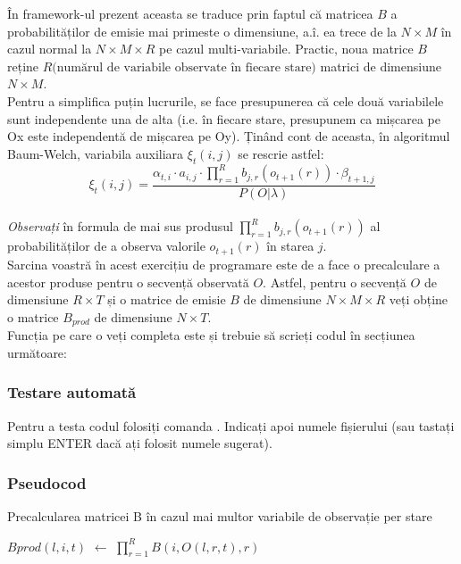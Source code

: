 \documentclass[12pt]{article}
\begin{document}
În framework-ul prezent aceasta se traduce prin faptul că matricea $B$ a probabilităților de emisie mai primeste
o dimensiune, a.î. ea trece de la $N \times M$ în cazul normal la $N \times M \times R$ pe cazul multi-variabile. Practic, noua matrice $B$ reține $R \mbox{(numărul de variabile observate în fiecare stare)}$ matrici de dimensiune $N \times M$.\\%
Pentru a simplifica puțin lucrurile, se face presupunerea că cele două variabilele sunt independente una de alta
(i.e. în fiecare stare, presupunem ca mișcarea pe Ox este independentă de mișcarea pe Oy). Ținând cont de aceasta,
în algoritmul Baum-Welch, variabila auxiliara $\xi_t(i,j)$ se rescrie astfel:
\begin{equation*}
	 \xi_t(i,j) = \frac{\alpha_{t,i}\cdot a_{i,j} \cdot \prod_{r=1}^{R}b_{j,r}(o_{t+1}(r)) \cdot \beta_{t+1,j}}
	 					{P(O \vert \lambda)}
\end{equation*}
\\%
\emph{Observați} în formula de mai sus produsul $\prod_{r=1}^{R}b_{j,r}(o_{t+1}(r))$ al probabilităților de a observa valorile $o_{t+1}(r)$ în starea $j$.\\
Sarcina voastră în acest exercițiu de programare este de a face o precalculare a acestor produse pentru o secvență observată $O$. Astfel, pentru o secvență $O$ de dimensiune $R \times T$ și o matrice de emisie $B$ de dimensiune 
$N \times M \times R$ veți obține o matrice $B_{prod}$ de dimensiune $N \times T$.
\\
Funcția pe care o veți completa este  și trebuie să scrieți codul în secțiunea următoare:



\subsubsection{Testare automată}

Pentru a testa codul folosiți comanda
. Indicați apoi numele
fișierului (sau tastați simplu ENTER dacă ați folosit numele sugerat).

\subsubsection{Pseudocod}

\begin{algorithm}[H]
  \caption{Precalcularea matricei B în cazul mai multor variabile de observație per stare}
  \label{alg:alexinmultestematrici}
  \begin{algorithmic}[2]
    \STATE $Bprod(l,i,t)$ $\leftarrow$ $\displaystyle\prod_{r=1}^{R}B(i,O(l,r,t),r)$
    \ENDFOR
    \ENDFOR
    \ENDFOR
  \end{algorithmic} 
\end{algorithm}
\end{document}
